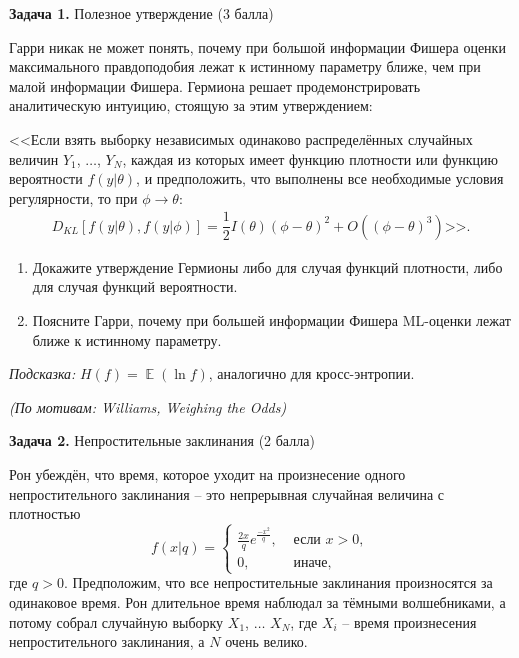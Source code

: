 \documentclass[10pt, a4paper]{extarticle}
\DeclareMathOperator{\E}{\mathbb{E}}
\begin{document}
	\newpage

	{\Large \textbf{Задача 1.} Полезное утверждение (3 балла)}
	
	Гарри никак не может понять, почему при большой информации Фишера оценки максимального правдоподобия лежат к истинному параметру ближе, чем при малой информации Фишера.
	Гермиона решает продемонстрировать аналитическую интуицию, стоящую за этим утверждением:
	
	<<Если взять выборку независимых одинаково распределённых случайных величин $Y_1$, $\ldots$, $Y_N$, каждая из которых имеет функцию плотности или функцию вероятности $f(y | \theta)$, и предположить, что выполнены все необходимые условия регулярности, то при $\phi \to \theta$:
	\begin{align*}
	D_{KL}\left[f(y | \theta), f(y | \phi)\right] = \dfrac{1}{2} I(\theta)(\phi - \theta)^2 + O((\phi - \theta)^3)\text{>>}.
	\end{align*}
	
	\begin{enumerate}[label=\textbf{\alph*)}]
		\item Докажите утверждение Гермионы либо для случая функций плотности, либо для случая функций вероятности.
		\item Поясните Гарри, почему при большей информации Фишера ML-оценки лежат ближе к истинному параметру. 
	\end{enumerate}

	\textit{Подсказка:} $H(f) = \E(\ln f)$, аналогично для кросс-энтропии.
	
	\begin{flushright}
		\textit{\small (По мотивам: Williams, Weighing the Odds)}
	\end{flushright}

	
	{\Large \textbf{Задача 2.} Непростительные заклинания (2 балла)}
	
	Рон убеждён, что время, которое уходит на произнесение одного непростительного заклинания -- это непрерывная случайная величина с плотностью
	\[
	f(x | q) = \begin{cases}
		\frac{2x}{q} e^{\frac{-x^2}{q}}, &\text{ если } x > 0, \\
		0, &\text{ иначе,}
	\end{cases}
	\]
	где $q > 0$.
	Предположим, что все непростительные заклинания произносятся за одинаковое время.
	Рон длительное время наблюдал за тёмными волшебниками, а потому собрал случайную выборку $X_1$, $\ldots$ $X_N$, где $X_i$ -- время произнесения непростительного заклинания, а $N$ очень велико.
	
\end{document}
